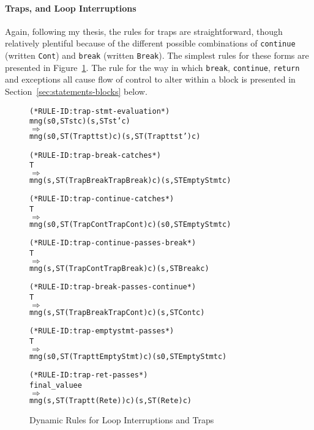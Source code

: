 \documentclass[11pt]{article}
\begin{document}
\paragraph{Traps, and Loop Interruptions}
%
%
%
%
%
%
Again, following my thesis, the rules for traps are straightforward,
though relatively plentiful because of the different possible
combinations of \texttt{continue} (written \texttt{Cont}) and
\texttt{break} (written \texttt{Break}).  The simplest rules for these
forms are presented in Figure~\ref{fig:traps}.  The rule for the way
in which \texttt{break}, \texttt{continue}, \texttt{return} and
exceptions all cause flow of control to alter within a block is
presented in Section~\ref{sec:statements-blocks} below.

\begin{figure}[htbp]
%
%
%
%
%
%
%
\begin{alltt}
(* RULE-ID: trap-stmt-evaluation *)
     mng (s0, ST st c) (s, ST st' c)
   \(\Rightarrow\)
     mng (s0, ST (Trap tt st) c) (s, ST (Trap tt st') c)

(* RULE-ID: trap-break-catches *)
     T
   \(\Rightarrow\)
     mng (s, ST (Trap BreakTrap Break) c) (s, ST EmptyStmt c)

(* RULE-ID: trap-continue-catches *)
     T
   \(\Rightarrow\)
     mng (s0, ST (Trap ContTrap Cont) c) (s0, ST EmptyStmt c)

(* RULE-ID: trap-continue-passes-break *)
     T
   \(\Rightarrow\)
     mng (s, ST (Trap ContTrap Break) c) (s, ST Break c)

(* RULE-ID: trap-break-passes-continue *)
     T
   \(\Rightarrow\)
     mng (s, ST (Trap BreakTrap Cont) c) (s, ST Cont c)

(* RULE-ID: trap-emptystmt-passes *)
     T
   \(\Rightarrow\)
     mng (s0, ST (Trap tt EmptyStmt) c) (s0, ST EmptyStmt c)

(* RULE-ID: trap-ret-passes *)
     final_value e
   \(\Rightarrow\)
     mng (s, ST (Trap tt (Ret e)) c) (s, ST (Ret e) c)
\end{alltt}
  \caption{Dynamic Rules for Loop Interruptions and Traps}
  \label{fig:traps}
\end{figure}
\end{document}
